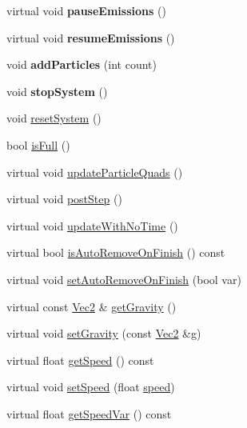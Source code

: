\begin{DoxyCompactItemize}
virtual void {\bfseries pause\+Emissions} ()
\item 
\mbox{\label{classParticleSystem_af2c902ad152c61f0597423786f170946}} 
virtual void {\bfseries resume\+Emissions} ()
\item 
\mbox{\label{classParticleSystem_a44c0e75a279680bd7575352f4ae2d400}} 
void {\bfseries add\+Particles} (int count)
\item 
\mbox{\label{classParticleSystem_ae818b81f78ec0ecfa232efe532b83a36}} 
void {\bfseries stop\+System} ()
\item 
void \hyperlink{classParticleSystem_a54f9c6da030873853af3f97dc745e68f}{reset\+System} ()
\item 
bool \hyperlink{classParticleSystem_a7f2ed7b7b7a0d5a078ac8df3c1503e47}{is\+Full} ()
\item 
virtual void \hyperlink{classParticleSystem_a517376136d7bee60f3e56639c89ee407}{update\+Particle\+Quads} ()
\item 
virtual void \hyperlink{classParticleSystem_a234dc9e985d7e742c8fe8ee548b9ff7c}{post\+Step} ()
\item 
virtual void \hyperlink{classParticleSystem_ae68eb1e779229e3fddad274e883fd5eb}{update\+With\+No\+Time} ()
\item 
virtual bool \hyperlink{classParticleSystem_afb8b312b2eeabd69210a5d63392d7626}{is\+Auto\+Remove\+On\+Finish} () const
\item 
virtual void \hyperlink{classParticleSystem_ab4800f4aef21f54119cdf9e5a991274b}{set\+Auto\+Remove\+On\+Finish} (bool var)
\item 
virtual const \hyperlink{classVec2}{Vec2} \& \hyperlink{classParticleSystem_a4170082ee1842b93181614cc871b8433}{get\+Gravity} ()
\item 
virtual void \hyperlink{classParticleSystem_a0696a1081d5f9f8879ace4e81f447015}{set\+Gravity} (const \hyperlink{classVec2}{Vec2} \&g)
\item 
virtual float \hyperlink{classParticleSystem_aa7bf969cc80cb87a09a306ffa948f365}{get\+Speed} () const
\item 
virtual void \hyperlink{classParticleSystem_a56f9b4f1d63ca8e20ddfa6ecbf4cd6da}{set\+Speed} (float \hyperlink{classParticleSystem_a1a4bba0d174d86e0a941b71c1d485b50}{speed})
\item 
virtual float \hyperlink{classParticleSystem_a64eea072c0c4cc4ac912d6f9cf95f835}{get\+Speed\+Var} () const

\end{DoxyCompactItemize}
